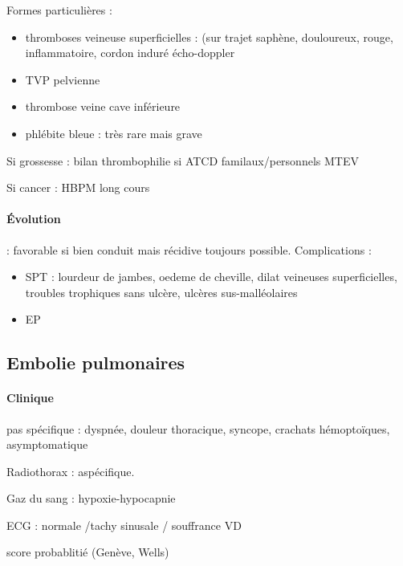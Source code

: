 Formes particulières :
\begin{itemize}
  \item thromboses veineuse superficielles : (sur trajet saphène, douloureux,
    rouge, inflammatoire, cordon induré \thus écho-doppler
  \item TVP pelvienne
  \item thrombose veine cave inférieure
  \item phlébite bleue : très rare mais grave
\end{itemize}

Si grossesse : bilan thrombophilie si ATCD familaux/personnels MTEV

Si cancer : HBPM long cours

\paragraph{Évolution} : favorable si bien conduit mais récidive toujours
possible. Complications : 
\begin{itemize}
  \item SPT : lourdeur de jambes, oedeme de cheville, dilat veineuses
    superficielles, troubles trophiques sans ulcère, ulcères sus-malléolaires
  \item EP
\end{itemize}

\subsection{Embolie pulmonaires}

\paragraph{Clinique} pas spécifique : dyspnée, douleur thoracique, syncope,
crachats hémoptoïques, asymptomatique

Radiothorax : aspécifique. 

Gaz du sang : hypoxie-hypocapnie

ECG : normale /tachy sinusale / souffrance VD

\thus score probablitié (Genève, Wells)

